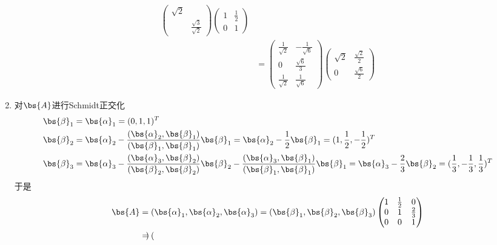 \documentclass[12pt, a4paper, oneside, UTF8]{ctexbook}
\begin{document}
\begin{solution}
\begin{enumerate}[label=(\arabic*)]
\begin{align*}
\begin{pmatrix}
                \sqrt{2} & \\
                & \frac{\sqrt{3}}{\sqrt{2}}
            \end{pmatrix}
                \begin{pmatrix}
                    1 &\frac{1}{2}\\
                    0 & 1
            \end{pmatrix}\\
            &=\begin{pmatrix}
                \frac{1}{\sqrt{2}}& -\frac{1}{\sqrt{6}}\\
                0& \frac{\sqrt{6}}{3}\\
                \frac{1}{\sqrt{2}}&\frac{1}{\sqrt{6}}
            \end{pmatrix}
            \begin{pmatrix}
                \sqrt{2} &\frac{\sqrt{2}}{2}\\
                0 & \frac{\sqrt{6}}{2}
            \end{pmatrix}
        \end{align*}
        \item 对$\bs{A}$进行Schmidt正交化
        \begin{align*}
            \bs{\beta}_1&=\bs{\alpha}_1=(0,1,1)^T\\
            \bs{\beta}_2&=\bs{\alpha}_2-\frac{(\bs{\alpha}_2,\bs{\beta}_1)}{(\bs{\beta}_1,\bs{\beta}_1)}\bs{\beta}_1
            =\bs{\alpha}_2-\frac{1}{2}\bs{\beta}_1=
            (1,\frac{1}{2},-\frac{1}{2})^T\\
            \bs{\beta}_3&=\bs{\alpha}_3
            -\frac{(\bs{\alpha}_3,\bs{\beta}_2)}{(\bs{\beta}_2,\bs{\beta}_2)}\bs{\beta}_2
            -\frac{(\bs{\alpha}_3,\bs{\beta}_1)}{(\bs{\beta}_1,\bs{\beta}_1)}\bs{\beta}_1
            =\bs{\alpha}_3-\frac{2}{3}\bs{\beta}_2=
            (\frac{1}{3},-\frac{1}{3},\frac{1}{3})^T
        \end{align*}
        于是
        \begin{align*}
            \bs{A}
            &=(\bs{\alpha}_1,\bs{\alpha}_2,\bs{\alpha}_3)
            =(\bs{\beta}_1,\bs{\beta}_2,\bs{\beta}_3)
            \begin{pmatrix}
                1 &\frac{1}{2}&0\\
                0 & 1&\frac{2}{3} \\
                0&0&1
            \end{pmatrix}\\
            &=\begin{pmatrix}

\end{pmatrix}
\end{align*}
\end{enumerate}
\end{solution}
\end{document}
